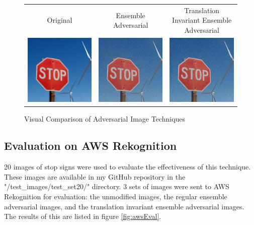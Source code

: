 \documentclass{article}
\begin{document}
\begin{figure}
\begin{tabular}{c c c}
    Original & Ensemble Adversarial & Translation Invariant Ensemble Adversarial \\
    \includegraphics[width=0.3\linewidth]{../test_images/test_set20/431d3546f1189614.jpg} & \includegraphics[width=0.3\linewidth]{../test_images/not_translated/ensemble_adversarial_431d3546f1189614.png}  & \includegraphics[width=0.3\linewidth]{../test_images/ensemble_translated/ensemble_adversarial_431d3546f1189614.png} \\
\end{tabular}
\caption{Visual Comparison of Adversarial Image Techniques}
\end{figure}

\subsection{Evaluation on AWS Rekognition}

20 images of stop signs were used to evaluate the effectiveness of this technique. These images are available in my GitHub repository in the "/test\_images/test\_set20/" directory. 3 sets of images were sent to AWS Rekognition for evaluation: the unmodified images, the regular ensemble adversarial images, and the translation invariant ensemble adversarial images. The results of this are listed in figure \ref{fig:awsEval}.
\end{document}
